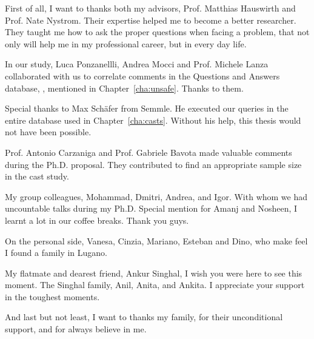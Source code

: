 \begin{acknowledgements}
First of all, I want to thanks both my advisors,
Prof. Matthias Hauswirth and Prof. Nate Nystrom.
Their expertise helped me to become a better researcher.
They taught me how to ask the proper questions when facing a problem,
that not only will help me in my professional career,
but in every day life.

In our \unsafe{} study,
Luca Ponzanellli, Andrea Mocci and Prof. Michele Lanza
collaborated with us to correlate \unsafe{} 
comments in the Questions and Answers database, \stackoverflow{}, mentioned in Chapter~\ref{cha:unsafe}.
Thanks to them.

Special thanks to Max Sch\"afer from Semmle.
He executed our \ql{} queries in the entire \lgtm{} database used in Chapter~\ref{cha:casts}.
Without his help, this thesis would not have been possible.

Prof. Antonio Carzaniga and Prof. Gabriele Bavota made valuable comments during the Ph.D. proposal.
They contributed to find an appropriate sample size in the cast study.

My group colleagues, Mohammad, Dmitri, Andrea, and Igor.
With whom we had uncountable talks during my Ph.D.
Special mention for Amanj and Nosheen,
I learnt a lot in our coffee breaks.
Thank you guys.

On the personal side,
Vanesa, Cinzia, Mariano, Esteban and Dino, who make feel I found a family in Lugano.

My flatmate and dearest friend, Ankur Singhal,
I wish you were here to see this moment.
The Singhal family, Anil, Anita, and Ankita.
I appreciate your support in the toughest moments.

And last but not least,
I want to thanks my family, for their unconditional support,
and for always believe in me.

\end{acknowledgements}
